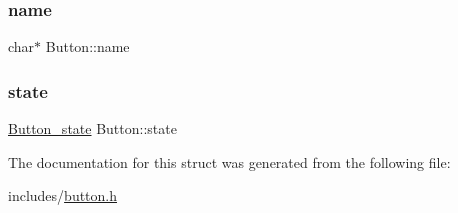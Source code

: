 \mbox{\label{structButton_a78b139339c3b53eb0082803c3b518dad}} 
\subsubsection{\texorpdfstring{name}{name}}
{\footnotesize\ttfamily char$\ast$ Button\+::name}

\mbox{\label{structButton_a375398be8d6c20f90febbd0a803b1aec}} 
\subsubsection{\texorpdfstring{state}{state}}
{\footnotesize\ttfamily \hyperlink{button_8h_a01cda3effbb71c7c203e4f9716e8844d}{Button\+\_\+state} Button\+::state}



The documentation for this struct was generated from the following file\+:\begin{DoxyCompactItemize}
\item 
includes/\hyperlink{button_8h}{button.\+h}\end{DoxyCompactItemize}
